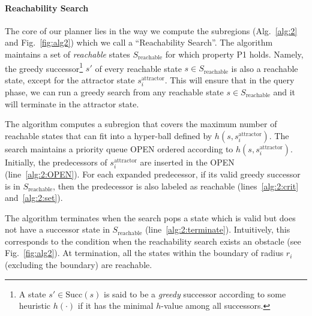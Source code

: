 \documentclass[letterpaper]{article} %
\newcommand{\sAttract}{\ensuremath{s^{\text{attractor}}_i}\xspace}
\begin{document}
\paragraph*{Reachability Search}
The core of our planner lies in the way we compute the subregions (Alg.~\ref{alg:2} and Fig.~\ref{fig:alg2}) which we call a ``Reachability Search''. The algorithm maintains a set of \emph{reachable} states $S_{\text{reachable}}$ for which property P1 holds. 
Namely, the greedy successor\footnote{A state $s' \in \text{Succ}(s)$ is said to be a \emph{greedy} successor according to some heuristic $h(\cdot)$ if it has the minimal $h$-value  among all successors.} $s'$ of every reachable state $s \in S_{\text{reachable}}$ is also a reachable state, except for the attractor state \sAttract. 
This will ensure that in the query phase, we can run a greedy search from any reachable state $s \in S_{\text{reachable}}$ and it will terminate in the attractor state. 

The algorithm computes a subregion that covers the maximum number of reachable states that can fit into a hyper-ball defined by $h(s,\sAttract)$. 
The search maintains a priority queue OPEN ordered according to $h(s,\sAttract)$. Initially, the predecessors of $\sAttract$ are inserted in the OPEN (line~\ref{alg:2:OPEN}). For each expanded predecessor, if its valid greedy successor is in $S_{\text{reachable}}$, then the predecessor is also labeled as reachable (lines~\ref{alg:2:crit} and~\ref{alg:2:set}). 


The algorithm terminates when the search pops a state which is valid but does not have a successor state in $S_{\text{reachable}}$ (line~\ref{alg:2:terminate}). Intuitively, this corresponds to the condition when the reachability search exists an obstacle (see Fig.~\ref{fig:alg2}). At termination, all the states within the boundary of radius $r_i$ (excluding the boundary) are reachable.
\end{document}
